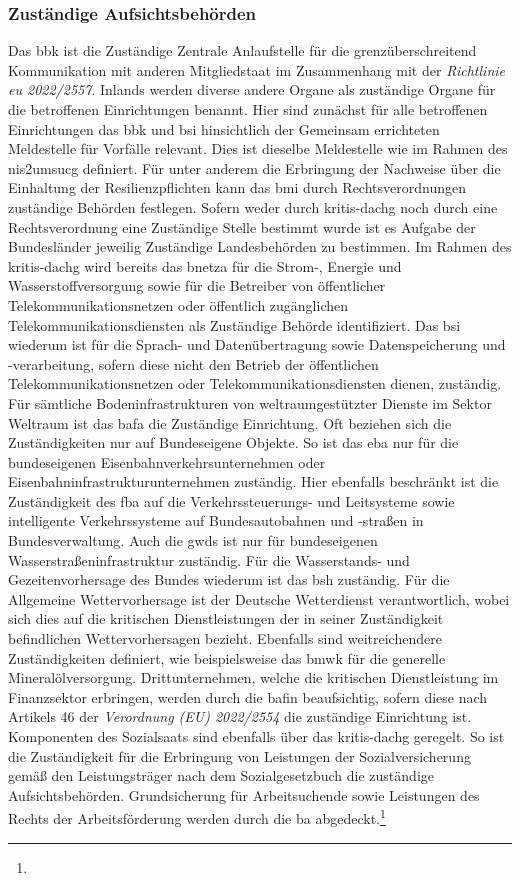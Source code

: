\documentclass[11pt,a4paper,hidelinks]{article}   %
\begin{document}
                \subsubsection{Zuständige Aufsichtsbehörden}
                Das \gls{bbk} ist die Zuständige Zentrale Anlaufstelle für die grenzüberschreitend Kommunikation mit anderen Mitgliedstaat im Zusammenhang mit der \emph{Richtlinie \gls{eu} 2022/2557}. Inlands werden diverse andere Organe als zuständige Organe für die betroffenen Einrichtungen benannt. Hier sind zunächst für alle betroffenen Einrichtungen das \gls{bbk} und \gls{bsi} hinsichtlich der Gemeinsam errichteten Meldestelle für Vorfälle relevant. Dies ist dieselbe Meldestelle wie im Rahmen des \gls{nis2umsucg} definiert. Für unter anderem die Erbringung der Nachweise über die Einhaltung der Resilienzpflichten kann das \gls{bmi} durch Rechtsverordnungen zuständige Behörden festlegen. Sofern weder durch \gls{kritis-dachg} noch durch eine Rechtsverordnung eine Zuständige Stelle bestimmt wurde ist es Aufgabe der Bundesländer jeweilig Zuständige Landesbehörden zu bestimmen. Im Rahmen des \gls{kritis-dachg} wird bereits das \gls{bnetza} für die Strom-, Energie und Wasserstoffversorgung sowie für die Betreiber von öffentlicher Telekommunikationsnetzen oder öffentlich zugänglichen Telekommunikationsdiensten als Zuständige Behörde identifiziert. Das \gls{bsi} wiederum ist für die Sprach- und Datenübertragung sowie Datenspeicherung und -verarbeitung, sofern diese nicht den Betrieb der öffentlichen Telekommunikationsnetzen oder Telekommunikationsdiensten dienen, zuständig. Für sämtliche Bodeninfrastrukturen von weltraumgestützter Dienste im Sektor Weltraum ist das \gls{bafa} die Zuständige Einrichtung. Oft beziehen sich die Zuständigkeiten nur auf Bundeseigene Objekte. So ist das \gls{eba} nur für die bundeseigenen Eisenbahnverkehrsunternehmen oder Eisenbahninfrastrukturunternehmen zuständig. Hier ebenfalls beschränkt ist die Zuständigkeit des \gls{fba} auf die Verkehrssteuerungs- und Leitsysteme sowie intelligente Verkehrssysteme auf Bundesautobahnen und -straßen in Bundesverwaltung. Auch die \gls{gwds} ist nur für bundeseigenen Wasserstraßeninfrastruktur zuständig. Für die Wasserstands- und Gezeitenvorhersage des Bundes wiederum ist das \gls{bsh} zuständig. Für die Allgemeine Wettervorhersage ist der Deutsche Wetterdienst verantwortlich, wobei sich dies auf die kritischen Dienstleistungen der in seiner Zuständigkeit befindlichen Wettervorhersagen bezieht. Ebenfalls sind weitreichendere Zuständigkeiten definiert, wie beispielsweise das \gls{bmwk} für die generelle Mineralölversorgung. Drittunternehmen, welche die kritischen Dienstleistung im Finanzsektor erbringen, werden durch die \gls{bafin} beaufsichtig, sofern diese nach Artikels 46 der \emph{Verordnung (EU) 2022/2554} die zuständige Einrichtung ist. Komponenten des Sozialsaats sind ebenfalls über das \gls{kritis-dachg} geregelt. So ist die Zuständigkeit für die Erbringung von Leistungen der Sozialversicherung gemäß den Leistungsträger nach dem Sozialgesetzbuch die zuständige Aufsichtsbehörden. Grundsicherung für Arbeitsuchende sowie Leistungen des Rechts der Arbeitsförderung werden durch die \gls{ba} abgedeckt.\footnote{
}
\end{document}
